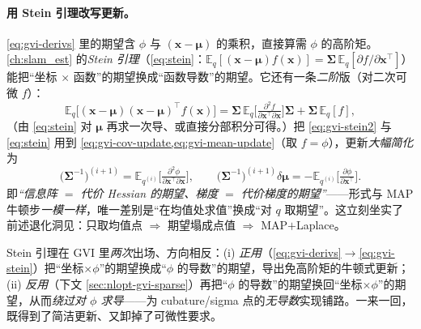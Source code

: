 \paragraph{用 Stein 引理改写更新。}
\cref{eq:gvi-derivs} 里的期望含 $\phi$ 与 $(\mathbf{x}-\boldsymbol{\mu})$ 的乘积，直接算需 $\phi$ 的高阶矩。\cref{ch:slam_est} 的\emph{Stein 引理}（\cref{eq:stein}：$\mathbb{E}_q[(\mathbf{x}-\boldsymbol{\mu})f(\mathbf{x})]=\boldsymbol{\Sigma}\,\mathbb{E}_q[\partial f/\partial\mathbf{x}^\top]$）能把“坐标 $\times$ 函数”的期望换成“函数导数”的期望。它还有一条\emph{二阶}版（对二次可微 $f$）：
\begin{equation}
  \mathbb{E}_q\big[(\mathbf{x}-\boldsymbol{\mu})(\mathbf{x}-\boldsymbol{\mu})^\top f(\mathbf{x})\big]
  =\boldsymbol{\Sigma}\,\mathbb{E}_q\!\Big[\tfrac{\partial^2 f}{\partial\mathbf{x}^\top\partial\mathbf{x}}\Big]\boldsymbol{\Sigma}+\boldsymbol{\Sigma}\,\mathbb{E}_q[f],
  \label{eq:gvi-stein2}
\end{equation}
（由 \cref{eq:stein} 对 $\boldsymbol{\mu}$ 再求一次导、或直接分部积分可得。）把 \cref{eq:gvi-stein2} 与 \cref{eq:stein} 用到 \cref{eq:gvi-cov-update,eq:gvi-mean-update}（取 $f=\phi$），更新\emph{大幅简化}为
\begin{equation}
  \boxed{\ \big(\boldsymbol{\Sigma}^{-1}\big)^{(i+1)}=\mathbb{E}_{q^{(i)}}\!\Big[\tfrac{\partial^2\phi}{\partial\mathbf{x}^\top\partial\mathbf{x}}\Big],\qquad
  \big(\boldsymbol{\Sigma}^{-1}\big)^{(i+1)}\delta\boldsymbol{\mu}=-\mathbb{E}_{q^{(i)}}\!\Big[\tfrac{\partial\phi}{\partial\mathbf{x}^\top}\Big].\ }
  \label{eq:gvi-stein}
\end{equation}
即\emph{“信息阵 $=$ 代价 Hessian 的期望、梯度 $=$ 代价梯度的期望”}——形式与 MAP 牛顿步\emph{一模一样}，唯一差别是“在均值处求值”换成“对 $q$ 取期望”。这立刻坐实了前述退化洞见：只取均值点 $\Rightarrow$ 期望塌成点值 $\Rightarrow$ MAP$+$Laplace。

\begin{insight}
Stein 引理在 GVI 里\emph{两次}出场、方向相反：(i) \emph{正用}（\cref{eq:gvi-derivs}$\to$\cref{eq:gvi-stein}）把“坐标$\times\phi$”的期望换成“$\phi$ 的导数”的期望，导出免高阶矩的牛顿式更新；(ii) \emph{反用}（下文 \cref{sec:nlopt-gvi-sparse}）再把“$\phi$ 的导数”的期望换回“坐标$\times\phi$”的期望，从而\emph{绕过对 $\phi$ 求导}——为 cubature/sigma 点的\emph{无导数}实现铺路。一来一回，既得到了简洁更新、又卸掉了可微性要求。
\end{insight}

